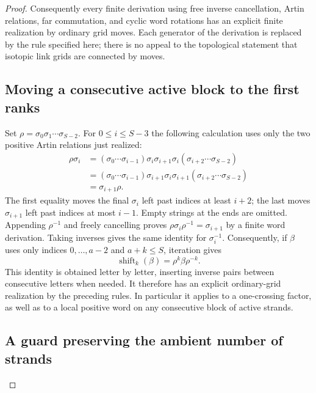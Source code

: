 \documentclass[11pt,a4paper]{article}
\theoremstyle{remark}
\begin{document}
\begin{proof}
Consequently every finite derivation using free inverse cancellation,
Artin relations, far commutation, and cyclic word rotations has an
explicit finite realization by ordinary grid moves.  Each generator
of the derivation is replaced by the rule specified here; there is no
appeal to the topological statement that isotopic link grids are
connected by moves.

\subsection{Moving a consecutive active block to the first ranks}

Set $\rho=\sigma_0\sigma_1\cdots\sigma_{S-2}$.  For
$0\le i\le S-3$ the following calculation uses only the two positive
Artin relations just realized:
\begin{align*}
 \rho\sigma_i
 &= (\sigma_0\cdots\sigma_{i-1})
       \sigma_i\sigma_{i+1}\sigma_i
       (\sigma_{i+2}\cdots\sigma_{S-2})\\
 &= (\sigma_0\cdots\sigma_{i-1})
       \sigma_{i+1}\sigma_i\sigma_{i+1}
       (\sigma_{i+2}\cdots\sigma_{S-2})\\
 &=\sigma_{i+1}\rho.
\end{align*}
The first equality moves the final $\sigma_i$ left past indices at
least $i+2$; the last moves $\sigma_{i+1}$ left past indices at most
$i-1$.  Empty strings at the ends are omitted.  Appending
$\rho^{-1}$ and freely cancelling proves
$\rho\sigma_i\rho^{-1}=\sigma_{i+1}$ by a finite word derivation.
Taking inverses gives the same identity for $\sigma_i^{-1}$.
Consequently, if $\beta$ uses only indices $0,\ldots,a-2$ and
$a+k\le S$, iteration gives
\[
 \operatorname{shift}_k(\beta)=\rho^k\beta\rho^{-k}.
\]
This identity is obtained letter by letter, inserting inverse pairs
between consecutive letters when needed.  It therefore has an
explicit ordinary-grid realization by the preceding rules.  In
particular it applies to a one-crossing factor, as well as to a local
positive word on any consecutive block of active strands.

\subsection{A guard preserving the ambient number of strands}


\end{proof}
\end{document}
